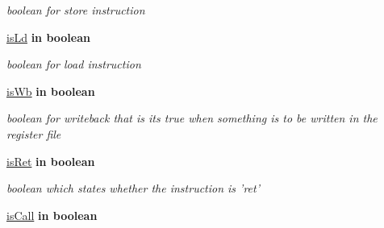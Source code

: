 \begin{DoxyCompactItemize}
\begin{DoxyCompactList}\small\item\em boolean for store instruction \end{DoxyCompactList}\item 
\hypertarget{class_o_f_unit_a4f328a19e16850a109722d3bf847ea76}{\hyperlink{class_o_f_unit_a4f328a19e16850a109722d3bf847ea76}{is\-Ld}  {\bfseries {\bfseries \textcolor{vhdlkeyword}{in}\textcolor{vhdlchar}{ }}} {\bfseries \textcolor{comment}{boolean}\textcolor{vhdlchar}{ }} }\label{class_o_f_unit_a4f328a19e16850a109722d3bf847ea76}

\begin{DoxyCompactList}\small\item\em boolean for load instruction \end{DoxyCompactList}\item 
\hypertarget{class_o_f_unit_a2824764974bcc836bcb65f7660df3501}{\hyperlink{class_o_f_unit_a2824764974bcc836bcb65f7660df3501}{is\-Wb}  {\bfseries {\bfseries \textcolor{vhdlkeyword}{in}\textcolor{vhdlchar}{ }}} {\bfseries \textcolor{comment}{boolean}\textcolor{vhdlchar}{ }} }\label{class_o_f_unit_a2824764974bcc836bcb65f7660df3501}

\begin{DoxyCompactList}\small\item\em boolean for writeback that is its true when something is to be written in the register file \end{DoxyCompactList}\item 
\hypertarget{class_o_f_unit_acc9e88547584f5ec26824185166a68ec}{\hyperlink{class_o_f_unit_acc9e88547584f5ec26824185166a68ec}{is\-Ret}  {\bfseries {\bfseries \textcolor{vhdlkeyword}{in}\textcolor{vhdlchar}{ }}} {\bfseries \textcolor{comment}{boolean}\textcolor{vhdlchar}{ }} }\label{class_o_f_unit_acc9e88547584f5ec26824185166a68ec}

\begin{DoxyCompactList}\small\item\em boolean which states whether the instruction is 'ret' \end{DoxyCompactList}\item 
\hypertarget{class_o_f_unit_a7c4ebeb76d12c2b065431834e3e40b61}{\hyperlink{class_o_f_unit_a7c4ebeb76d12c2b065431834e3e40b61}{is\-Call}  {\bfseries {\bfseries \textcolor{vhdlkeyword}{in}\textcolor{vhdlchar}{ }}} {\bfseries \textcolor{comment}{boolean}\textcolor{vhdlchar}{ }} }\label{class_o_f_unit_a7c4ebeb76d12c2b065431834e3e40b61}


\end{DoxyCompactItemize}

